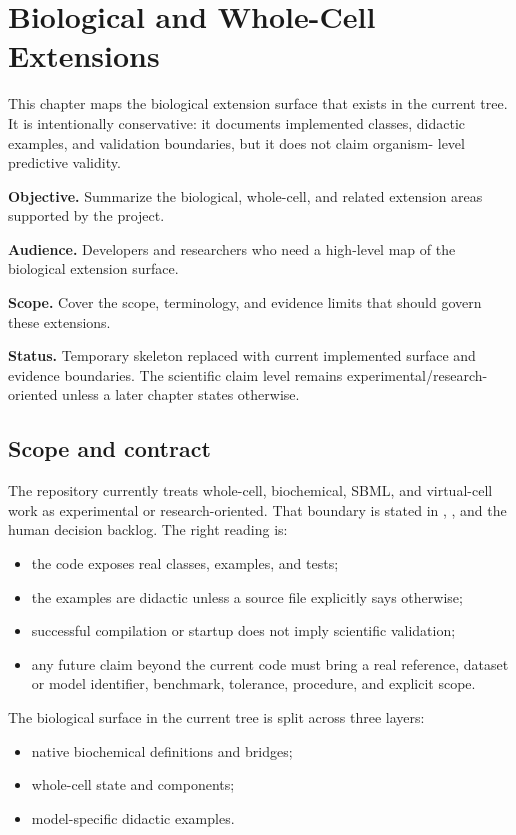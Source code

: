\chapter{Biological and Whole-Cell Extensions}
\label{chap:biological-and-whole-cell-extensions}

This chapter maps the biological extension surface that exists in the current
tree. It is intentionally conservative: it documents implemented classes,
didactic examples, and validation boundaries, but it does not claim organism-
level predictive validity.

\noindent\textbf{Objective.} Summarize the biological, whole-cell, and related
extension areas supported by the project.

\noindent\textbf{Audience.} Developers and researchers who need a high-level map
of the biological extension surface.

\noindent\textbf{Scope.} Cover the scope, terminology, and evidence limits that
should govern these extensions.

\noindent\textbf{Status.} Temporary skeleton replaced with current implemented
surface and evidence boundaries. The scientific claim level remains
experimental/research-oriented unless a later chapter states otherwise.

\section{Scope and contract}

The repository currently treats whole-cell, biochemical, SBML, and virtual-cell
work as experimental or research-oriented. That boundary is stated in
, ,
and the human decision backlog. The right reading is:
\begin{itemize}
\item the code exposes real classes, examples, and tests;
\item the examples are didactic unless a source file explicitly says otherwise;
\item successful compilation or startup does not imply scientific validation;
\item any future claim beyond the current code must bring a real reference,
      dataset or model identifier, benchmark, tolerance, procedure, and
      explicit scope.
\end{itemize}

The biological surface in the current tree is split across three layers:
\begin{itemize}
\item native biochemical definitions and bridges;
\item whole-cell state and components;
\item model-specific didactic examples.
\end{itemize}

